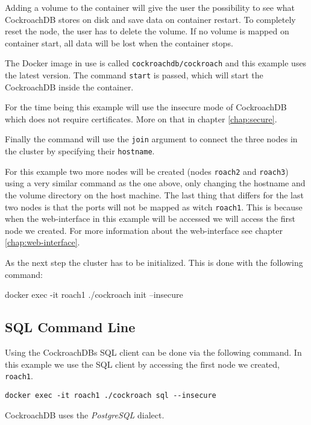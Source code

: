\medskip
Adding a volume to the container will give the user the possibility to see what CockroachDB stores on disk and save data on container restart. To completely reset the node, the user has to delete the volume. If no volume is mapped on container start, all data will be lost when the container stops. 

\medskip
The Docker image in use is called \verb|cockroachdb/cockroach| and this example uses the latest version. The command \verb|start| is passed, which will start the CockroachDB inside the container.

\medskip
For the time being this example will use the insecure mode of CockroachDB which does not require certificates. More on that in chapter \ref{chap:secure}. 

\medskip
Finally the command will use the \verb|join| argument to connect the three nodes in the cluster by specifying their \verb|hostname|.

\bigskip
For this example two more nodes will be created (nodes \verb|roach2| and \verb|roach3|) using a very similar command as the one above, only changing the hostname and the volume directory on the host machine. The last thing that differs for the last two nodes is that the ports will not be mapped as witch \verb|roach1|. This is because when the web-interface in this example will be accessed we will access the first node we created. For more information about the web-interface see chapter \ref{chap:web-interface}.
\bigskip

As the next step the cluster has to be initialized. This is done with the following command:

\begin{verb}
docker exec -it roach1 ./cockroach init --insecure
\end{verb}

\cite{cockroachdocker}

\subsection{SQL Command Line}
Using the CockroachDBs SQL client can be done via the following command. In this example we use the SQL client by accessing the first node we created, \verb|roach1|.
\begin{verbatim}
docker exec -it roach1 ./cockroach sql --insecure
\end{verbatim}

CockroachDB uses the \emph{PostgreSQL} dialect.

